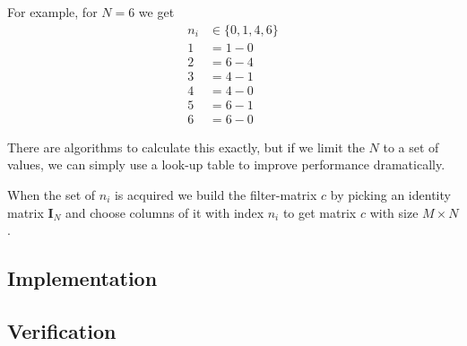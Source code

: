 \documentclass[report, oneside, a4paper, openany]{memoir}
\begin{document}
For example, for $N=6$ we get
\begin{equation*}
\begin{split}
n_i&\in\{0,1,4,6\}\\
1 &= 1-0\\
2 &= 6-4\\
3 &= 4-1\\
4 &= 4-0\\
5 &= 6-1\\
6 &= 6-0
\end{split}
\end{equation*}


There are algorithms to calculate this exactly, but if we limit the $N$ to a set of values, we can simply use a look-up table to improve performance dramatically.

When the set of $n_i$ is acquired we build the filter-matrix $c$ by picking an identity matrix $\mathbf{I}_N$ and choose columns of it with index $n_i$ to get matrix $c$ with size $M \times N$.

\subsection{Implementation}

\subsection{Verification}
\end{document}
